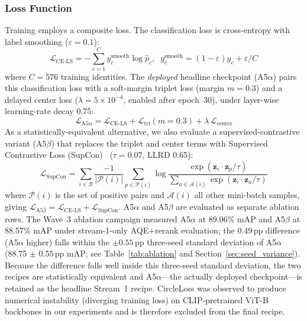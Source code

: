 \documentclass[11pt]{article}
\begin{document}
\subsubsection{Loss Function}
Training employs a composite loss. The classification loss is cross-entropy
with label smoothing ($\varepsilon = 0.1$):
\begin{equation}
  \mathcal{L}_{\mathrm{CE\text{-}LS}} =
    -\sum_{c=1}^{C} y_c^{\mathrm{smooth}} \log \hat{p}_c, \;\;
    y_c^{\mathrm{smooth}} = (1{-}\varepsilon)y_c + \varepsilon/C
  \label{eq:cels}
\end{equation}
where $C = 576$ training identities. The \emph{deployed} headline checkpoint
(A5$\alpha$) pairs this classification loss with a soft-margin triplet loss
(margin $m{=}0.3$) and a delayed center loss
($\lambda{=}5\times10^{-4}$, enabled after epoch~30), under layer-wise
learning-rate decay 0.75:
\begin{equation}
  \mathcal{L}_{\mathrm{A5\alpha}} =
    \mathcal{L}_{\mathrm{CE\text{-}LS}}
    + \mathcal{L}_{\mathrm{tri}}(m{=}0.3)
    + \lambda\,\mathcal{L}_{\mathrm{center}}
  \label{eq:a5alpha}
\end{equation}
As a statistically-equivalent alternative, we also evaluate a
supervised-contrastive variant (A5$\beta$) that replaces the triplet and
center terms with Supervised Contrastive Loss
(SupCon)~\cite{khosla2020supcon} ($\tau = 0.07$, LLRD 0.65):
\begin{equation}
  \mathcal{L}_{\mathrm{SupCon}} =
    \sum_{i \in \mathcal{B}}
      \frac{-1}{|\mathcal{P}(i)|}
      \sum_{p \in \mathcal{P}(i)}
        \log
        \frac{\exp(\mathbf{z}_i \cdot \mathbf{z}_p / \tau)}
             {\sum_{a \in \mathcal{A}(i)} \exp(\mathbf{z}_i \cdot \mathbf{z}_a / \tau)}
  \label{eq:supcon}
\end{equation}
where $\mathcal{P}(i)$ is the set of positive pairs and $\mathcal{A}(i)$ all
other mini-batch samples, giving
$\mathcal{L}_{\mathrm{A5\beta}} = \mathcal{L}_{\mathrm{CE\text{-}LS}} + \mathcal{L}_{\mathrm{SupCon}}$.
A5$\alpha$ and A5$\beta$ are evaluated as separate ablation rows. The Wave~3
ablation campaign measured A5$\alpha$ at 89.06\% mAP and A5$\beta$ at 88.57\%
mAP under stream-1-only AQE+rerank evaluation; the 0.49\,pp difference
(A5$\alpha$ higher) falls within the $\pm 0.55$\,pp three-seed standard
deviation of A5$\alpha$ (88.75 $\pm$ 0.55\,pp mAP; see
Table~\ref{tab:ablation} and Section~\ref{sec:seed_variance}). Because the
difference falls well inside this three-seed standard deviation, the two
recipes are statistically equivalent and A5$\alpha$---the actually deployed
checkpoint---is retained as the headline Stream~1 recipe.
CircleLoss was observed to produce numerical instability (diverging training
loss) on CLIP-pretrained ViT-B backbones in our experiments and is therefore
excluded from the final recipe.
\end{document}
